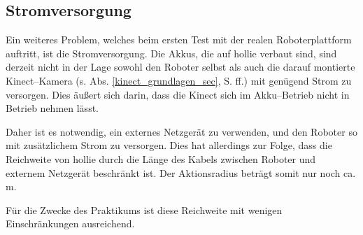 


\subsection{Stromversorgung}

Ein weiteres Problem, welches beim ersten Test mit der realen Roboterplattform auftritt, ist die Stromversorgung.
Die Akkus, die auf \gls{hollie} verbaut sind, sind derzeit nicht in der Lage sowohl den Roboter selbst als auch die darauf montierte Kinect--Kamera (s. Abs. \ref{kinect_grundlagen_sec}, S. \pageref{kinect_grundlagen_sec} ff.) mit genügend Strom zu versorgen.
Dies äußert sich darin, dass die Kinect sich im Akku--Betrieb nicht in Betrieb nehmen lässt.

Daher ist es notwendig, ein externes Netzgerät zu verwenden, und den Roboter so mit zusätzlichem Strom zu versorgen.
Dies hat allerdings zur Folge, dass die Reichweite von \gls{hollie} durch die Länge des Kabels zwischen Roboter und externem Netzgerät beschränkt ist.
Der Aktionsradius beträgt somit nur noch ca. \unit[5]{m}.

Für die Zwecke des Praktikums ist diese Reichweite mit wenigen Einschränkungen ausreichend.




